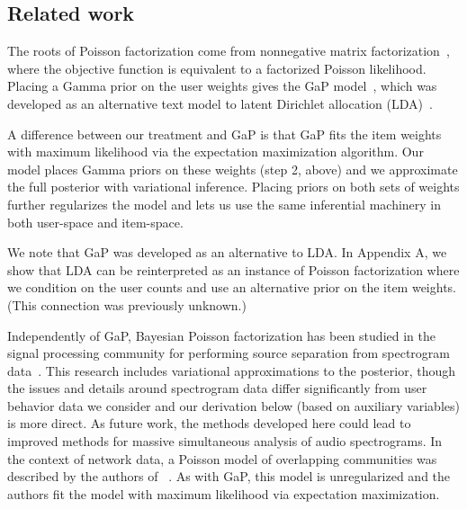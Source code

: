 \documentclass{sig-alternate}
\begin{document}

\subsection{Related work}

The roots of Poisson factorization come from nonnegative matrix
factorization~\cite{Lee:1999}, where the objective function is
equivalent to a factorized Poisson likelihood.  Placing a Gamma prior
on the user weights gives the GaP model~\cite{Canny:2004}, which was
developed as an alternative text model to latent Dirichlet allocation
(LDA)~\cite{Blei:2003b}.

A difference between our treatment and GaP is that GaP fits the item
weights with maximum likelihood via the expectation maximization
algorithm.  Our model places Gamma priors on these weights (step 2,
above) and we approximate the full posterior with variational
inference.  Placing priors on both sets of weights further regularizes
the model and lets us use the same inferential machinery in both
user-space and item-space.  


We note that GaP was developed as an alternative to LDA. In Appendix
A, we show that LDA can be reinterpreted as an instance of Poisson
factorization where we condition on the user counts and use an
alternative prior on the item weights.  (This connection was
previously unknown.)

Independently of GaP, Bayesian Poisson factorization has been studied
in the signal processing community for performing source separation
from spectrogram data~\cite{Cemgil:2009,Hoffman:2012}.  This research
includes variational approximations to the posterior, though the
issues and details around spectrogram data differ significantly from
user behavior data we consider and our derivation below (based on
auxiliary variables) is more direct.  As future work, the methods
developed here could lead to improved methods for massive simultaneous
analysis of audio spectrograms. In the context of network data, a
Poisson model of overlapping communities was described by the authors
of ~\cite{Ball:2011}. As with GaP, this model is unregularized and the
authors fit the model with maximum likelihood via expectation
maximization.
\end{document}
